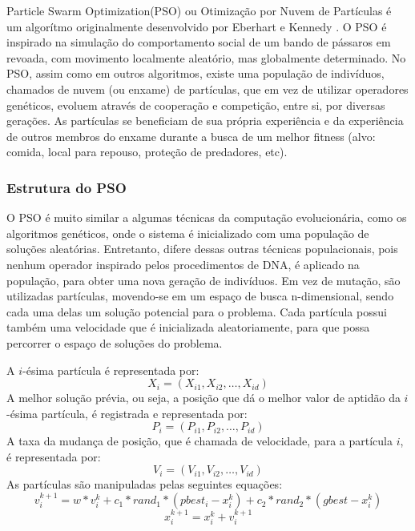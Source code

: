 \documentclass[a4paper,10pt]{article}
\begin{document}
Particle Swarm Optimization(PSO) ou Otimização por Nuvem de Partículas é um algorítmo originalmente 
desenvolvido por Eberhart e Kennedy \cite{pso_article}. O PSO é inspirado na simulação do comportamento social de um 
bando de pássaros em revoada, com movimento localmente aleatório, mas globalmente determinado. No PSO, 
assim como em outros algoritmos, existe uma população de indivíduos, chamados de nuvem (ou enxame) de 
partículas, que em vez de utilizar operadores genéticos, evoluem através de cooperação e competição, entre si, 
por diversas gerações. As partículas se beneficiam de sua própria experiência e da experiência de outros membros 
do enxame durante a busca de um melhor fitness (alvo: comida, local para repouso, proteção de predadores, etc).

\subsubsection{Estrutura do PSO}

O PSO é muito similar a algumas técnicas da computação evolucionária, como os algoritmos genéticos, onde o 
sistema é inicializado com uma população de soluções aleatórias. Entretanto, difere dessas outras técnicas 
populacionais, pois nenhum operador inspirado pelos procedimentos de DNA, é aplicado na população, para obter 
uma nova geração de indivíduos. Em vez de mutação, são utilizadas partículas, movendo-se em um espaço de busca 
n-dimensional, sendo cada uma delas um solução potencial para o problema. Cada partícula possui também uma 
velocidade que é inicializada aleatoriamente, para que possa percorrer o espaço de soluções do problema.

A $i$-ésima partícula é representada por:
\begin{equation}
X_{i} = (X_{i1}, X_{i2},\ldots, X_{id})
\end{equation}
A melhor solução prévia, ou seja, a posição que dá o melhor valor de aptidão da $i$-ésima partícula, é registrada e representada por:
\begin{equation}
P_{i} = (P_{i1}, P_{i2},\ldots, P_{id})
\end{equation}
A taxa da mudança de posição, que é chamada de velocidade, para a partícula $i$, é representada por:
\begin{equation}
V_{i} = (V_{i1}, V_{i2},\ldots, V_{id})
\end{equation}
As partículas são manipuladas pelas seguintes equações:
\begin{equation}
v_{i}^{k+1} = w*v_{i}^k + c_{1}*rand_{1} * (pbest_{i} - x_{i}^k) + c_{2}*rand_{2} * (gbest - x_{i}^k) \label{velocidade}
\end{equation}
\begin{equation}
x_{i}^{k+1} = x_{i}^k + v_{i}^{k+1} \label{posicao}
\end{equation}
\end{document}

